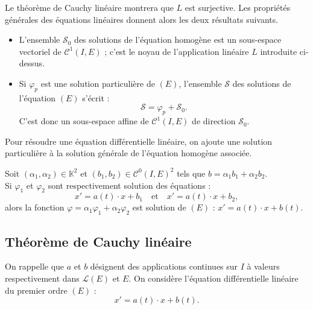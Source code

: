 \documentclass[french]{article}
\newcommand{\K}{\mathbb{K}}
\theoremstyle{plain}
\theoremstyle{definition}
\theoremstyle{remark}
\begin{document}
Le théorème de Cauchy linéaire montrera que $L$ est surjective. Les propriétés générales des équations linéaires donnent alors les deux résultats suivants.

\begin{prop}%
	\begin{itemize}
		\item L'ensemble $\mathcal{S}_0$ des solutions de l'équation homogène est un sous-espace vectoriel de $\mathcal{C}^1(I,E)$ ; c'est le noyau de l'application linéaire $L$ introduite ci-dessus.
		\item Si $\varphi_p$ est une solution particulière de $(E)$, l'ensemble $\mathcal{S}$ des solutions de l'équation $(E)$ s'écrit :
		$$\mathcal{S}=\varphi_p+\mathcal{S}_0.$$
		C'est donc un sous-espace affine de $\mathcal{C}^1(I,E)$ de direction $\mathcal{S}_0$.
	\end{itemize}
\end{prop}

\begin{met}
	Pour résoudre une équation différentielle linéaire, on ajoute une solution particulière à la solution générale de l'équation homogène associée.
\end{met}

\begin{prop}%
	Soit $(\alpha_1,\alpha_2)\in\K^2$ et $(b_1,b_2)\in\mathcal{C}^0(I,E)^2$ tels que $b=\alpha_1b_1+\alpha_2b_2$. \\
	Si $\varphi_1$ et $\varphi_2$ sont respectivement solution des équations :
	$$x'=a(t)\cdot x+b_1\quad\text{et}\quad x'=a(t)\cdot x+b_2,$$ alors la fonction $\varphi=\alpha_1\varphi_1+\alpha_2\varphi_2$ est solution de $(E)$ : $x'=a(t)\cdot x+b(t)$.
\end{prop}

\subsection{Théorème de Cauchy linéaire}

On rappelle que $a$ et $b$ désignent des applications continues sur $I$ à valeurs respectivement dans $\mathcal{L}(E)$ et $E$. On considère l'équation différentielle linéaire du premier ordre $(E)$ :
$$x'=a(t)\cdot x+b(t).$$
\end{document}
